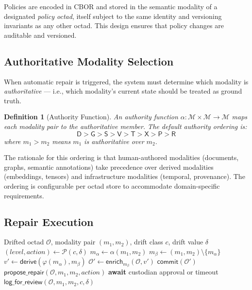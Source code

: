 \documentclass[11pt,twocolumn]{article}
\newtheorem{definition}{Definition}[section]
\newcommand{\octad}{\mathcal{O}}
\newcommand{\modset}{\mathcal{M}}
\newcommand{\policyfn}{\mathcal{P}}
\begin{document}
Policies are encoded in CBOR and stored in the semantic modality of a
designated \emph{policy octad}, itself subject to the same identity and
versioning invariants as any other octad.  This design ensures that policy
changes are auditable and versioned.

\subsection{Authoritative Modality Selection}

When automatic repair is triggered, the system must determine which modality
is \emph{authoritative} --- i.e., which modality's current state should be
treated as ground truth.

\begin{definition}[Authority Function]\label{def:authority}
An \emph{authority function} $\alpha : \modset \times \modset \to \modset$
maps each modality pair to the authoritative member.  The default authority
ordering is:
\[
  \mathsf{D} > \mathsf{G} > \mathsf{S} > \mathsf{V} > \mathsf{T} >
  \mathsf{X} > \mathsf{P} > \mathsf{R}
\]
where $m_1 > m_2$ means $m_1$ is authoritative over $m_2$.
\end{definition}

The rationale for this ordering is that human-authored modalities (documents,
graphs, semantic annotations) take precedence over derived modalities
(embeddings, tensors) and infrastructure modalities (temporal, provenance).
The ordering is configurable per octad store to accommodate domain-specific
requirements.

\subsection{Repair Execution}

\begin{algorithm}[t]
\caption{Policy-Driven Repair Execution}\label{alg:repair}
\begin{algorithmic}[1]
\Require Drifted octad $\octad$, modality pair $(m_1, m_2)$,
  drift class $c$, drift value $\delta$
\State $(\mathit{level}, \mathit{action}) \gets \policyfn(c, \delta)$
  \State $m_\alpha \gets \alpha(m_1, m_2)$
  \State $m_\beta \gets (m_1, m_2) \setminus \{m_\alpha\}$
  \State $v' \gets \mathsf{derive}(\varphi(m_\alpha), m_\beta)$
  \State $\octad' \gets \mathsf{enrich}_{m_\beta}(\octad, v')$
  \State $\mathsf{commit}(\octad')$
  \State $\mathsf{propose\_repair}(\octad, m_1, m_2, \mathit{action})$
  \State \textbf{await} custodian approval or timeout
\Else
  \State $\mathsf{log\_for\_review}(\octad, m_1, m_2, c, \delta)$
\EndIf
\end{algorithmic}
\end{algorithm}
\end{document}
